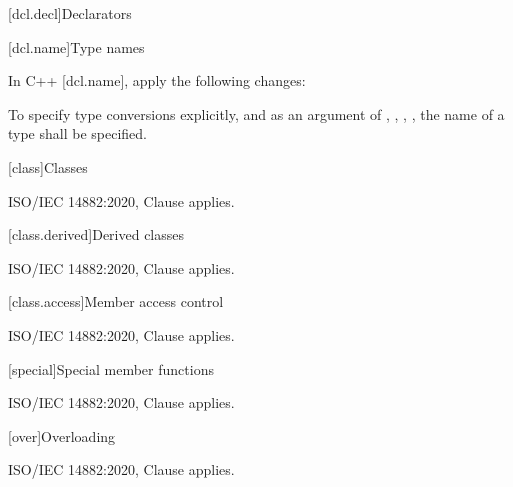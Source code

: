 
[dcl.decl]{Declarators}

[dcl.name]{Type names}

\pnum
In C++ [dcl.name], apply the following changes:

\begin{std.txt}
To specify type conversions explicitly, and as an argument of ,
, ,  ,  the name of a type shall be specified.
\end{std.txt}

[class]{Classes}

ISO/IEC 14882:2020, Clause \the\value{chapter} applies.

[class.derived]{Derived classes}

ISO/IEC 14882:2020, Clause \the\value{chapter} applies.

[class.access]{Member access control}

ISO/IEC 14882:2020, Clause \the\value{chapter} applies.

[special]{Special member functions}

ISO/IEC 14882:2020, Clause \the\value{chapter} applies.

[over]{Overloading}

ISO/IEC 14882:2020, Clause \the\value{chapter} applies.
